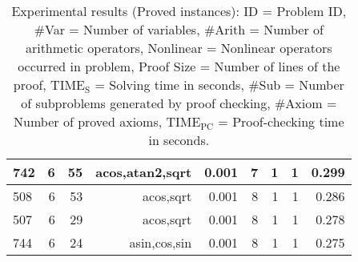 \begin{table}[th!]
\begin{center}
\begin{tabular}{|l||r|r|r||r|r|r|r|r|}
\hline
742 & 6 & 55 & acos,atan2,sqrt & 0.001 & 7 & 1 & 1 & 0.299 \\
\hline
508 & 6 & 53 & acos,sqrt & 0.001 & 8 & 1 & 1 & 0.286 \\
\hline
507 & 6 & 29 & acos,sqrt & 0.001 & 8 & 1 & 1 & 0.278 \\
\hline
744 & 6 & 24 & asin,cos,sin & 0.001 & 8 & 1 & 1 & 0.275\\
\hline
\end{tabular}
  \end{center}
  \caption{
    Experimental results (Proved instances):
    ID = Problem ID,
    \#Var = Number of variables,
    \#Arith = Number of arithmetic operators,
    Nonlinear = Nonlinear operators occurred in problem,
    Proof Size = Number of lines of the proof,
    $\mathrm{TIME_S}$ = Solving time in seconds,
    \#Sub = Number of subproblems generated by proof checking,
    \#Axiom = Number of proved axioms,
    $\mathrm{TIME_{PC}}$ = Proof-checking time in seconds.
  }\label{tbl:exp}
  \vspace{-1cm}
\end{table}

